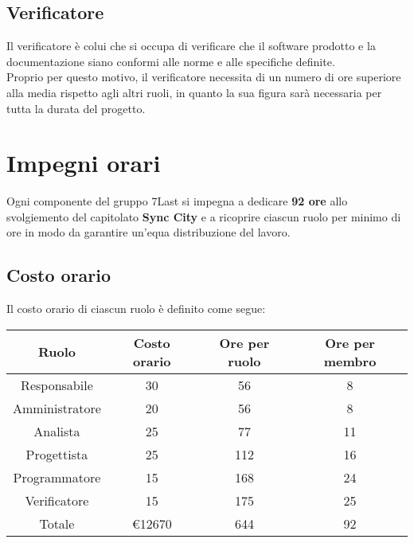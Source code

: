 \documentclass[italian,12pt]{article} %
\begin{document}
\subsection{Verificatore}
Il verificatore è colui che si occupa di verificare che il software prodotto e la documentazione siano conformi alle norme e alle specifiche definite.\\
Proprio per questo motivo, il verificatore necessita di un numero di ore superiore alla media rispetto agli altri ruoli, in quanto la sua figura sarà necessaria per tutta la durata del progetto.

\newpage
\section{Impegni orari}
Ogni componente del gruppo 7Last si impegna a dedicare \textbf{92 ore} allo svolgiemento del capitolato \textbf{Sync City} e a ricoprire ciascun ruolo per minimo di ore in modo da garantire un'equa distribuzione del lavoro.

\subsection{Costo orario}
Il costo orario di ciascun ruolo è definito come segue:

\begin{table}[!h]
	\begin{center}
		\begin{tabular}{ |c|c|c|c| }
			\hline
			Ruolo          & Costo orario & Ore per ruolo & Ore per membro \\
			\hline
			Responsabile   & 30           & 56            & 8              \\
			Amministratore & 20           & 56            & 8              \\
			Analista       & 25           & 77            & 11             \\
			Progettista    & 25           & 112           & 16             \\
			Programmatore  & 15           & 168           & 24             \\
			Verificatore   & 15           & 175           & 25             \\
			\hline
			Totale         & €12670       & 644           & 92             \\
			\hline
		\end{tabular}
	\end{center}
\end{table}
\end{document}
